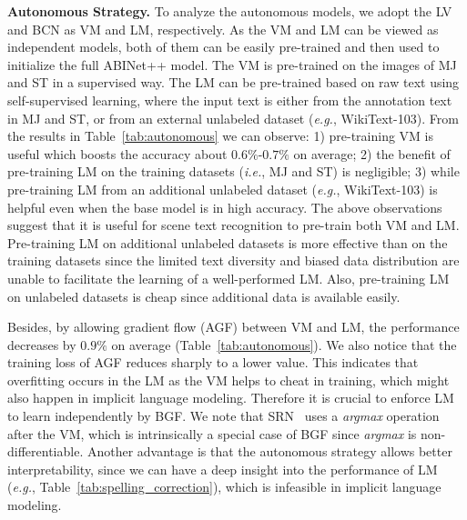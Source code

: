 \documentclass[10pt,journal,compsoc]{IEEEtran}
\def\ie{{\it i.e.}\xspace}
\def\eg{{\it e.g.}\xspace}
\begin{document}
\textbf{Autonomous Strategy.} To analyze the autonomous models, we adopt the LV and BCN as VM and LM, respectively. As the VM and LM can be viewed as independent models, both of them can be easily pre-trained and then used to initialize the full ABINet++ model. The VM is pre-trained on the images of MJ and ST in a supervised way. The LM can be pre-trained based on raw text using self-supervised learning, where the input text is either from the annotation text in MJ and ST, or from an external unlabeled dataset (\eg, WikiText-103). From the results in Table~\ref{tab:autonomous} we can observe: 1) pre-training VM is useful which boosts the accuracy about $0.6\%$-$0.7\%$ on average; 2) the benefit of pre-training LM on the training datasets (\ie, MJ and ST) is negligible; 3) while pre-training LM from an additional unlabeled dataset (\eg, WikiText-103) is helpful even when the base model is in high accuracy. The above observations suggest that it is useful for scene text recognition to pre-train both VM and LM. Pre-training LM on additional unlabeled datasets is more effective than on the training datasets since the limited text diversity and biased data distribution are unable to facilitate the learning of a well-performed LM. Also, pre-training LM on unlabeled datasets is cheap since additional data is available easily. 
 

Besides, by allowing gradient flow (AGF) between VM and LM, the performance decreases by $0.9\%$ on average (Table~\ref{tab:autonomous}). We also notice that the training loss of AGF reduces sharply to a lower value. This indicates that overfitting occurs in the LM as the VM helps to cheat in training, which might also happen in implicit language modeling. Therefore it is crucial to enforce LM to learn independently by BGF. We note that SRN~\cite{yu2020towards} uses a \emph{argmax} operation after the VM, which is intrinsically a special case of BGF since \emph{argmax} is non-differentiable. Another advantage is that the autonomous strategy allows better interpretability, since we can have a deep insight into the performance of LM (\eg, Table~\ref{tab:spelling_correction}), which is infeasible in implicit language modeling.
\end{document}
